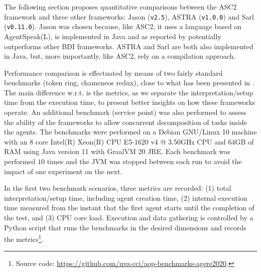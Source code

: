 The following section proposes quantitative comparisons between the ASC2 framework and three other frameworks: Jason (\verb+v2.5+), ASTRA (\verb+v1.0.0+) and Sarl (\verb+v0.11.0+). Jason \cite{Bordini2005} was chosen because, like ASC2, it uses a language based on AgentSpeak(L), is implemented in Java and as reported by \cite{Cardoso2013} potentially outperforms other BDI frameworks. ASTRA and Sarl are both also implemented in Java, but, more importantly, like ASC2, rely on a compilation approach. %

Performance comparison is effectuated by means of two fairly standard benchmarks (token ring, chameneos redux), close to what has been presented in \cite{Cardoso2013}. The main difference w.r.t. \cite{Cardoso2013} is the metrics, as we separate the interpretation/setup time from the execution time, to present better insights on how these frameworks operate. %
An additional benchmark (service point) was also performed to assess the ability of the frameworks to allow concurrent decomposition of tasks inside the agents. The benchmarks were performed on a {Debian GNU/Linux 10} machine with an 8 core {Intel(R) Xeon(R) CPU E5-1620 v4 @ 3.50GHz} CPU and {64GB} of RAM using Java version {11} with {GraalVM 20} JRE.  Each benchmark was performed $10$ times and the JVM was stopped between each run to avoid the impact of one experiment on the next. %

In the first two benchmark scenarios, three metrics are recorded: (1) total interpretation/setup time, including agent creation time, (2) internal execution time measured from the instant that the first agent starts until the completion of the test, and (3) CPU core load. Execution and data gathering is controlled by a Python script that runs the benchmarks in the desired dimensions and records the metrics\footnote{Source code: \url{https://github.com/uva-cci/aop-benchmarks-agere2020}.}. %

